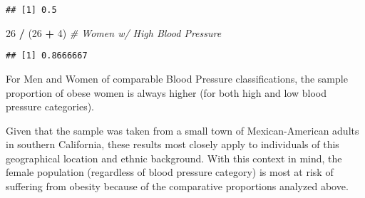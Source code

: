 \documentclass[]{article}
\newenvironment{Shaded}{\begin{snugshade}}{\end{snugshade}}
\newcommand{\DecValTok}[1]{\textcolor[rgb]{0.00,0.00,0.81}{#1}}
\newcommand{\StringTok}[1]{\textcolor[rgb]{0.31,0.60,0.02}{#1}}
\newcommand{\CommentTok}[1]{\textcolor[rgb]{0.56,0.35,0.01}{\textit{#1}}}
\newcommand{\OperatorTok}[1]{\textcolor[rgb]{0.81,0.36,0.00}{\textbf{#1}}}
\newcommand{\NormalTok}[1]{#1}
\begin{document}
\begin{verbatim}
## [1] 0.5
\end{verbatim}

\begin{Shaded}
\begin{Highlighting}[]
\DecValTok{26} \OperatorTok{/}\StringTok{ }\NormalTok{(}\DecValTok{26} \OperatorTok{+}\StringTok{ }\DecValTok{4}\NormalTok{) }\CommentTok{# Women w/ High Blood Pressure}
\end{Highlighting}
\end{Shaded}

\begin{verbatim}
## [1] 0.8666667
\end{verbatim}

For Men and Women of comparable Blood Pressure classifications, the
sample proportion of obese women is always higher (for both high and low
blood pressure categories).

Given that the sample was taken from a small town of Mexican-American
adults in southern California, these results most closely apply to
individuals of this geographical location and ethnic background. With
this context in mind, the female population (regardless of blood
pressure category) is most at risk of suffering from obesity because of
the comparative proportions analyzed above.
\end{document}
